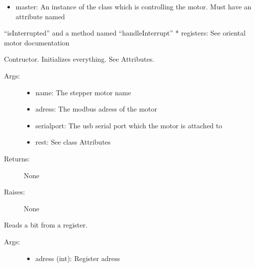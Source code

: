 \documentclass[letterpaper,10pt,english]{sphinxmanual}
\begin{document}
\begin{fulllineitems}
\begin{description}
\begin{itemize}
\item {} 
master: An instance of the class which is controlling the motor. Must have an attribute named

\end{itemize}

``isInterrupted'' and a method named ``handleInterrupt''
* registers: See oriental motor documentation

\end{description}

\begin{fulllineitems}
\label{stepperMotor:stepperMotor.StepperMotor.__init__}
Contructor. Initializes everything. See Attributes.
\begin{description}
\item[{Args:}] \leavevmode\begin{itemize}
\item {} 
name: The stepper motor name

\item {} 
adress: The modbus adress of the motor

\item {} 
serialport: The usb serial port which the motor is attached to

\item {} 
rest: See class Attributes

\end{itemize}

\item[{Returns:}] \leavevmode
None

\item[{Raises:}] \leavevmode
None

\end{description}

\end{fulllineitems}


\begin{fulllineitems}
\label{stepperMotor:stepperMotor.StepperMotor.getBitFromRegister}
Reads a bit from a register.
\begin{description}
\item[{Args:}] \leavevmode\begin{itemize}
\item {} 
adress (int): Register adress


\end{itemize}
\end{description}
\end{fulllineitems}
\end{fulllineitems}
\end{document}
